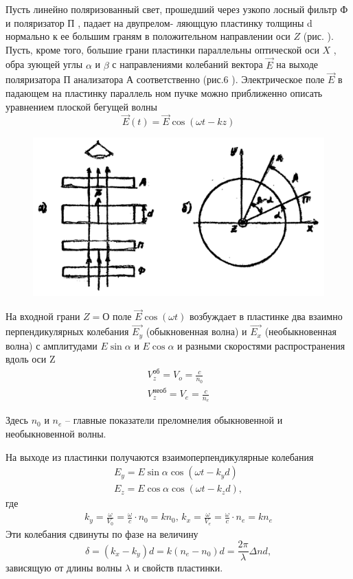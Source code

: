 Пусть линейно поляризованный свет, прошедший через узкопо­
лосный фильтр $\text{Ф}$ и поляризатор $\text{П}$ , падает на двупрелом-
ляющцую пластинку толщины d нормально к ее большим граням в
положительном направлении оси $Z$ (рис. ). Пусть, кроме того,
большие грани пластинки параллельны оптической оси $X$ , обра­
зующей углы $\alpha$ и $\beta$ с направлениями колебаний вектора $\vec{E}$
на выходе поляризатора П анализатора А соответственно
(рис.6 ). Электрическое поле $\vec{E}$ в падающем на пластинку параллель­
ном пучке можно приближенно описать уравнением плоской бегущей
волны 
\begin{equation}
	\vec{E}(t)=\vec{E}\cos(\omega t-kz)
\end{equation}

\begin{figure}[H]
	\centering
	\includegraphics[width=\textwidth]{pic/3f.jpg}
	\caption{}
	\label{fig:figure5}
\end{figure}

На входной грани $Z=О$ поле $\vec{E}\cos(\omega t)$ возбуждает
в пластинке два взаимно перпендикулярных колебания $\vec{E_y}$
(обыкновенная волна) и $\vec{E_x}$ (необыкновенная волна) с амплитудами $E\sin\alpha$ и $E\cos\alpha$ и разными скоростями
распространения вдоль оси Z
\begin{gather}
	V_z^{\text{об}}=V_o=\frac{c}{n_0} \\
	V_z^{\text{необ}}=V_e=\frac{c}{n_e}
\end{gather}

Здесь $n_0$ и $n_e$ -- главные показатели преломнелия обыкновенной и необыкновенной волны.

На выходе из пластинки получаются взаимоперпендикулярные колебания
\begin{gather}
	E_y=E\sin\alpha\cos(\omega t -k_yd) \\
	E_z=E\cos\alpha\cos(\omega t -k_zd),
\end{gather}
где
\begin{gather}
	k_y=\frac{\omega}{V_0}=\frac{\omega}{c}\cdot n_0=kn_0, \,
	k_x=\frac{\omega}{V_e}=\frac{\omega}{c}\cdot n_e=kn_e
\end{gather}
Эти колебания сдвинуты по фазе на величину
\begin{equation}
	\delta=(k_x-k_y)d=k(n_e-n_0)d=\frac{2\pi}{\lambda}\Delta nd,
\end{equation}
зависящую от длины волны $\lambda$ и свойств пластинки.

